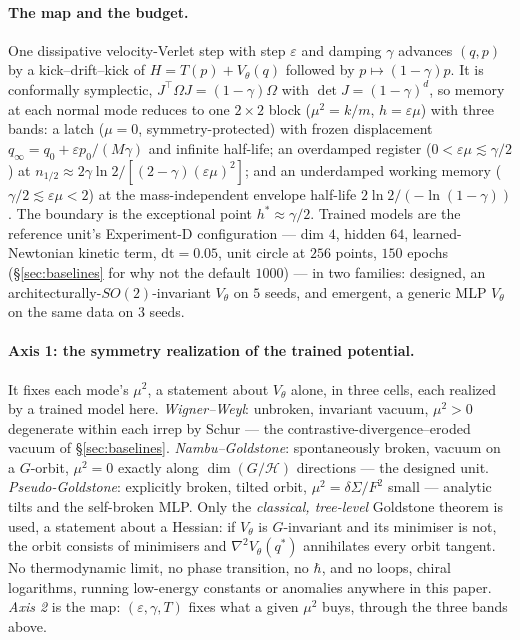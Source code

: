 \documentclass{article}
\begin{document}
\paragraph{The map and the budget.} One dissipative velocity-Verlet step with step $\varepsilon$ and damping $\gamma$ advances $(q,p)$ by a kick--drift--kick of $H=T(p)+V_\theta(q)$ followed by $p\mapsto(1-\gamma)p$. It is conformally symplectic, $J^\top\Omega J=(1-\gamma)\Omega$ with $\det J=(1-\gamma)^d$, so memory at each normal mode reduces to one $2\times2$ block ($\mu^2=k/m$, $h=\varepsilon\mu$) with three bands: a latch ($\mu=0$, symmetry-protected) with frozen displacement $q_\infty=q_0+\varepsilon p_0/(M\gamma)$ and infinite half-life; an overdamped register ($0<\varepsilon\mu\lesssim\gamma/2$) at $n_{1/2}\approx2\gamma\ln2/[(2-\gamma)(\varepsilon\mu)^2]$; and an underdamped working memory ($\gamma/2\lesssim\varepsilon\mu<2$) at the mass-independent envelope half-life $2\ln2/(-\ln(1-\gamma))$. The boundary is the exceptional point $h^*\approx\gamma/2$. Trained models are the reference unit's Experiment-D configuration --- dim $4$, hidden $64$, learned-Newtonian kinetic term, $\mathrm{dt}=0.05$, unit circle at $256$ points, $150$ epochs (\S\ref{sec:baselines} for why not the default $1000$) --- in two families: designed, an architecturally-$SO(2)$-invariant $V_\theta$ on $5$ seeds, and emergent, a generic MLP $V_\theta$ on the same data on $3$ seeds.

\paragraph{Axis 1: the symmetry realization of the trained potential.} It fixes each mode's $\mu^2$, a statement about $V_\theta$ alone, in three cells, each realized by a trained model here. \emph{Wigner--Weyl}: unbroken, invariant vacuum, $\mu^2>0$ degenerate within each irrep by Schur --- the contrastive-divergence--eroded vacuum of \S\ref{sec:baselines}. \emph{Nambu--Goldstone}: spontaneously broken, vacuum on a $G$-orbit, $\mu^2=0$ exactly along $\dim(G/\mathcal H)$ directions --- the designed unit. \emph{Pseudo-Goldstone}: explicitly broken, tilted orbit, $\mu^2=\delta\Sigma/F^2$ small --- analytic tilts and the self-broken MLP. Only the \emph{classical, tree-level} Goldstone theorem is used, a statement about a Hessian: if $V_\theta$ is $G$-invariant and its minimiser is not, the orbit consists of minimisers and $\nabla^2V_\theta(q^*)$ annihilates every orbit tangent. No thermodynamic limit, no phase transition, no $\hbar$, and no loops, chiral logarithms, running low-energy constants or anomalies anywhere in this paper. \emph{Axis 2} is the map: $(\varepsilon,\gamma,T)$ fixes what a given $\mu^2$ buys, through the three bands above.
\end{document}
